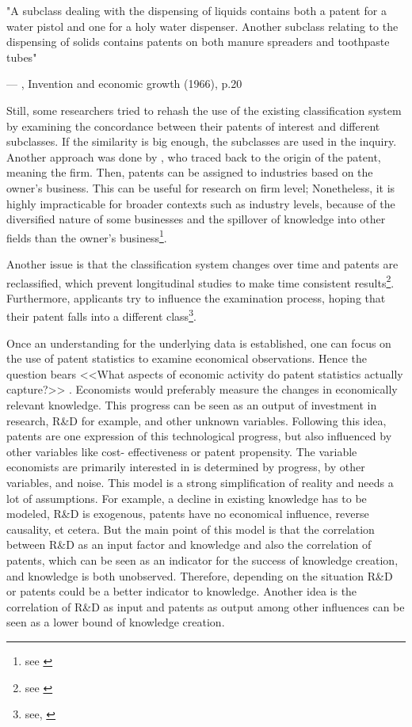 \documentclass[12pt, a4paper, abstract, parskip]{scrartcl}
\theoremstyle{definition}
\begin{document}
\epigraph{"A subclass dealing with the dispensing of liquids contains both a
patent for a water pistol and one for a holy water dispenser. Another subclass
relating to the dispensing of solids contains patents on both manure spreaders
and toothpaste tubes"}{--- \textup{\citeauthor{schmookler1966invention}},
Invention and economic growth (1966), p.20}

Still, some researchers tried to rehash the use of the existing classification
system by examining the concordance between their patents of interest and
different subclasses. If the similarity is big enough, the subclasses are used
in the inquiry. Another approach was done by \citeauthor{hall2001nber}, who
traced back to the origin of the patent, meaning the firm. Then, patents can be
assigned to industries based on the owner's business. This can be useful for
research on firm level; Nonetheless, it is highly impracticable for broader
contexts such as industry levels, because of the diversified nature of some
businesses and the spillover of knowledge into other fields than the owner's
business\footnote{see \cite{griliches1990patent}}.

Another issue is that the classification system changes over time and patents
are reclassified, which prevent longitudinal studies to make time consistent
results\footnote{see \citet{bessen2007empirical}}. Furthermore, applicants try
to influence the examination process, hoping that their patent falls into a
different class\footnote{see, \citet[p.21]{lerner2006new}}.

Once an understanding for the underlying data is established, one can focus on
the use of patent statistics to examine economical observations. Hence the
question bears <<What aspects of economic activity do patent statistics
actually capture?>> \citep[p. 296]{griliches1990patent}. Economists would
preferably measure the changes in economically relevant knowledge. This
progress can be seen as an output of investment in research, R\&D for example,
and other unknown variables. Following this idea, patents are one expression of
this technological progress, but also influenced by other variables like cost-
effectiveness or patent propensity. The variable economists are primarily
interested in is determined by progress, by other variables, and noise. This
model is a strong simplification of reality and needs a lot of assumptions. For
example, a decline in existing knowledge has to be modeled, R\&D is exogenous,
patents have no economical influence, reverse causality, et cetera. But the
main point of this model is that the correlation between R\&D as an input
factor and knowledge and also the correlation of patents, which can be seen as
an indicator for the success of knowledge creation, and knowledge is both
unobserved. Therefore, depending on the situation R\&D or patents could be a
better indicator to knowledge. Another idea is the correlation of R\&D as input
and patents as output among other influences can be seen as a lower bound of
knowledge creation.
\end{document}
